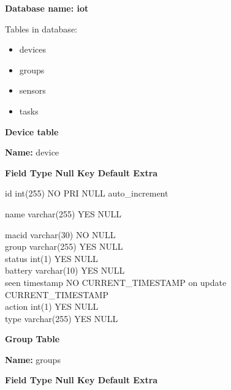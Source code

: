 \documentclass[16pt]{article}
\begin{document}
\textbf{Database name: iot}

Tables in database: 

\begin{itemize}

\item devices\\
\item groups\\ 
\item sensors\\
\item tasks  \\

\end{itemize}

\textbf{Device table}

\textbf{Name:} device

\textbf{\textbar{} Field \textbar{} Type \textbar{} Null \textbar{} Key
\textbar{} Default \textbar{} Extra \textbar{}}

\textbar{} id \textbar{} int(255) \textbar{} NO \textbar{} PRI
\textbar{} NULL \textbar{} auto\_increment \textbar{}

\textbar{} name \textbar{} varchar(255) \textbar{} YES \textbar{}
\textbar{} NULL \textbar{} \textbar{}

\textbar{} macid \textbar{} varchar(30) \textbar{} NO \textbar{}
\textbar{} NULL \textbar{} \textbar{}\\ \textbar{} group \textbar{}
varchar(255) \textbar{} YES \textbar{} \textbar{} NULL \textbar{}
\textbar{}\\ \textbar{} status \textbar{} int(1) \textbar{} YES
\textbar{} \textbar{} NULL \textbar{} \textbar{}\\ \textbar{} battery
\textbar{} varchar(10) \textbar{} YES \textbar{} \textbar{} NULL
\textbar{} \textbar{}\\ \textbar{} seen \textbar{} timestamp \textbar{}
NO \textbar{} \textbar{} CURRENT\_TIMESTAMP \textbar{} on update
CURRENT\_TIMESTAMP \textbar{}\\ \textbar{} action \textbar{} int(1)
\textbar{} YES \textbar{} \textbar{} NULL \textbar{} \textbar{}\\
\textbar{} type \textbar{} varchar(255) \textbar{} YES \textbar{}
\textbar{} NULL \textbar{} \textbar{}

\textbf{Group Table}

\textbf{Name:} groups

\textbf{\textbar{} Field \textbar{} Type \textbar{} Null \textbar{} Key
\textbar{} Default \textbar{} Extra \textbar{}}
\end{document}

